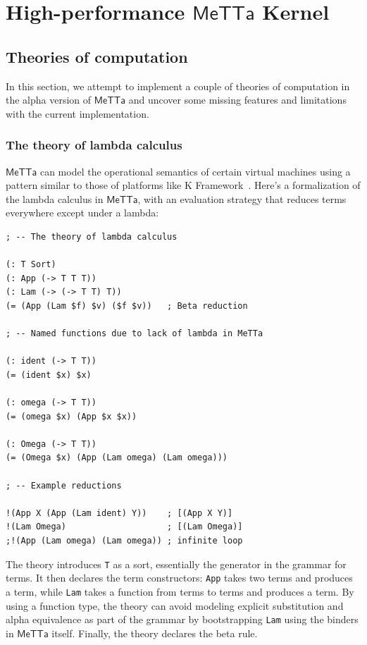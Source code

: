 \documentclass{article}
\begin{document}
\section{High-performance $\mathsf{MeTTa}$ Kernel}

\subsection{Theories of computation}
\label{Theories of computation}

In this section, we attempt to implement a couple of theories of
computation in the alpha version of $\mathsf{MeTTa}$ and uncover
some missing features and limitations with the current implementation.

\subsubsection{The theory of lambda calculus}
$\mathsf{MeTTa}$ can model the operational semantics of certain
virtual machines using a pattern similar to those of platforms like K
Framework~\cite{kframework}.  Here's a formalization of the lambda
calculus in $\mathsf{MeTTa}$, with an evaluation strategy that reduces
terms everywhere except under a lambda:

\begin{verbatim}
; -- The theory of lambda calculus

(: T Sort)
(: App (-> T T T))
(: Lam (-> (-> T T) T))
(= (App (Lam $f) $v) ($f $v))   ; Beta reduction

; -- Named functions due to lack of lambda in MeTTa

(: ident (-> T T))
(= (ident $x) $x)

(: omega (-> T T))
(= (omega $x) (App $x $x))

(: Omega (-> T T))
(= (Omega $x) (App (Lam omega) (Lam omega)))

; -- Example reductions

!(App X (App (Lam ident) Y))    ; [(App X Y)]
!(Lam Omega)                    ; [(Lam Omega)]
;!(App (Lam omega) (Lam omega)) ; infinite loop
\end{verbatim}

The theory introduces \verb+T+ as a sort, essentially the generator in
the grammar for terms.  It then declares the term constructors:
\verb+App+ takes two terms and produces a term, while \verb+Lam+ takes
a function from terms to terms and produces a term.  By using a
function type, the theory can avoid modeling explicit substitution and
alpha equivalence as part of the grammar by bootstrapping \verb+Lam+
using the binders in $\mathsf{MeTTa}$ itself.  Finally, the theory
declares the beta rule.
\end{document}

